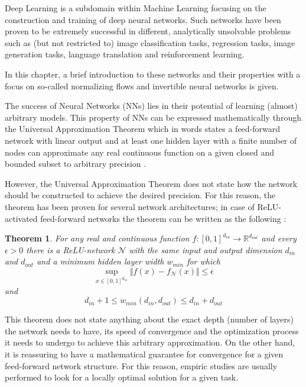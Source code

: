 \label{ch:deeplearning}

Deep Learning is a subdomain within Machine Learning focusing on the construction and training of deep neural networks. Such networks have been proven to be extremely successful in different, analytically unsolvable problems such as (but not restricted to) image classification tasks, regression tasks, image generation tasks, language translation and reinforcement learning.

In this chapter, a brief introduction to these networks and their properties with a focus on so-called normalizing flows and invertible neural networks is given.


The success of Neural Networks (NNs) lies in their potential of learning (almost) arbitrary models. This property of NNs can be expressed mathematically through the Universal Approximation Theorem which in words states a feed-forward network with linear output and at least one hidden layer with a finite number of nodes can approximate any real continuous function on a given closed and bounded subset to arbitrary precision \cite{DLiPR}.

However, the Universal Approximation Theorem does not state how the network should be constructed to achieve the desired precision. For this reason, the theorem has been proven for several network architectures; in case of ReLU-activated feed-forward networks the theorem can be written as the following \cite{UAC}:
\newtheorem{theorem}{Theorem}
\begin{theorem}
	For any real and continuous function $f : [0, 1]^{d_{in}} \rightarrow \mathbb{R}^{d_{out}}$ and every $\epsilon>0$ there is a ReLU-network $\mathcal{N}$ with the same input and output dimension $d_{in}$ and $d_{out}$ and a minimum hidden layer width $w_{min}$ for which
	\begin{equation*}
		\sup_{x\in[0, 1]^{d_{in}}}\Vert f(x)-f_\mathcal{N}(x)\Vert \leq \epsilon
	\end{equation*}
	and
	\begin{equation*}
		d_{in} + 1 \leq w_{min}(d_{in}, d_{out}) \leq d_{in} + d_{out}
	\end{equation*}
\end{theorem}
This theorem does not state anything about the exact depth (number of layers) the network needs to have, its speed of convergence and the optimization process it needs to undergo to achieve this arbitrary approximation. On the other hand, it is reassuring to have a mathematical guarantee for convergence for a given feed-forward network structure. For this reason, empiric studies are usually performed to look for a locally optimal solution for a given task.

